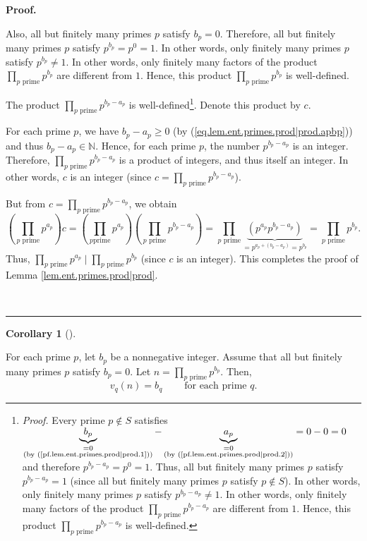 \documentclass[numbers=enddot,12pt,final,onecolumn,notitlepage]{scrartcl}%
\numberwithin{exer}{subsection}
\theoremstyle{definition}
\newtheorem{coro}[theo]{Corollary}
\newenvironment{corollary}[1][]
{\begin{coro}[#1]\begin{leftbar}}
{\end{leftbar}\end{coro}}
\newenvironment{fineprint}{\begin{small}}{\end{small}}
\newenvironment{proof}[1][Proof]{\noindent\textbf{#1.} }{\ \rule{0.5em}{0.5em}}
\let\prodnonlimits\prod
\renewcommand{\prod}{\prodnonlimits\limits}
\begin{document}
\begin{proof}
\begin{fineprint}
Also, all but finitely many primes $p$ satisfy $b_{p}=0$. Therefore, all but
finitely many primes $p$ satisfy $p^{b_{p}}=p^{0}=1$. In other words, only
finitely many primes $p$ satisfy $p^{b_{p}}\neq1$. In other words, only
finitely many factors of the product $\prod_{p\text{ prime}}p^{b_{p}}$ are
different from $1$. Hence, this product $\prod_{p\text{ prime}}p^{b_{p}}$ is well-defined.

The product $\prod_{p\text{ prime}}p^{b_{p}-a_{p}}$ is
well-defined\footnote{\textit{Proof. }Every prime $p\notin S$ satisfies
$\underbrace{b_{p}}_{\substack{=0\\\text{(by
(\ref{pf.lem.ent.primes.prod|prod.1}))}}}-\underbrace{a_{p}}%
_{\substack{=0\\\text{(by (\ref{pf.lem.ent.primes.prod|prod.2}))}}}=0-0=0$ and
therefore $p^{b_{p}-a_{p}}=p^{0}=1$. Thus, all but finitely many primes $p$
satisfy $p^{b_{p}-a_{p}}=1$ (since all but finitely many primes $p$ satisfy
$p\notin S$). In other words, only finitely many primes $p$ satisfy
$p^{b_{p}-a_{p}}\neq1$. In other words, only finitely many factors of the
product $\prod_{p\text{ prime}}p^{b_{p}-a_{p}}$ are different from $1$. Hence,
this product $\prod_{p\text{ prime}}p^{b_{p}-a_{p}}$ is well-defined.}. Denote
this product by $c$.

For each prime $p$, we have $b_{p}-a_{p}\geq0$ (by
(\ref{eq.lem.ent.primes.prod|prod.apbp})) and thus $b_{p}-a_{p}\in\mathbb{N}$.
Hence, for each prime $p$, the number $p^{b_{p}-a_{p}}$ is an integer.
Therefore, $\prod_{p\text{ prime}}p^{b_{p}-a_{p}}$ is a product of integers,
and thus itself an integer. In other words, $c$ is an integer (since
$c=\prod_{p\text{ prime}}p^{b_{p}-a_{p}}$).

But from $c=\prod_{p\text{ prime}}p^{b_{p}-a_{p}}$, we obtain%
\[
\left(  \prod_{p\text{ prime}}p^{a_{p}}\right)  c=\left(  \prod_{p\text{
prime}}p^{a_{p}}\right)  \left(  \prod_{p\text{ prime}}p^{b_{p}-a_{p}}\right)
=\prod_{p\text{ prime}}\underbrace{\left(  p^{a_{p}}p^{b_{p}-a_{p}}\right)
}_{=p^{a_{p}+\left(  b_{p}-a_{p}\right)  }=p^{b_{p}}}=\prod_{p\text{ prime}%
}p^{b_{p}}.
\]
Thus, $\prod_{p\text{ prime}}p^{a_{p}}\mid\prod_{p\text{ prime}}p^{b_{p}}$
(since $c$ is an integer). This completes the proof of Lemma
\ref{lem.ent.primes.prod|prod}.
\end{fineprint}
\end{proof}

\begin{corollary}
\label{cor.ent.primes.vp-of-can}For each prime $p$, let $b_{p}$ be a
nonnegative integer. Assume that all but finitely many primes $p$ satisfy
$b_{p}=0$. Let $n=\prod_{p\text{ prime}}p^{b_{p}}$. Then,%
\[
v_{q}\left(  n\right)  =b_{q}\ \ \ \ \ \ \ \ \ \ \text{for each prime }q.
\]

\end{corollary}
\end{document}
